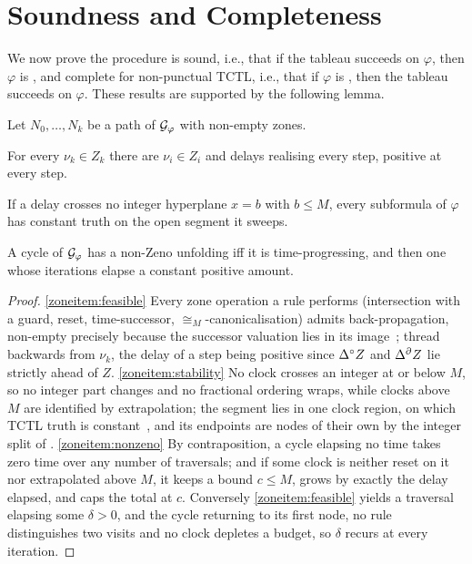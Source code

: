 
\section{Soundness and Completeness}\label{ss:sound}
We now prove the procedure is sound, i.e., that if the tableau succeeds on $\varphi$, then $\varphi$ is \SAT, and complete for non-punctual TCTL, i.e., that if $\varphi$ is \SAT, then the tableau succeeds on $\varphi$. These results are supported by the following lemma.
\begin{lemma}\label{lem:zones}
Let $N_0,\dots,N_k$ be a path of $\mathcal{G}_{\varphi}$ with non-empty zones.
\begin{enumerate*}[label=\emph{(\roman*)}, ref={(\roman*)}, itemjoin={{\ }}, itemjoin*={{\ }}]
\item\label{zoneitem:feasible} For every $\nu_k\in Z_k$ there are $\nu_i\in Z_i$ and delays realising
every step, positive at every  step.
\item\label{zoneitem:stability} If a delay crosses no integer hyperplane $x=b$ with $b\le M$, every
subformula of $\varphi$ has constant truth on the open segment it sweeps.
\item\label{zoneitem:nonzeno} A cycle of $\mathcal{G}_{\varphi}$ has a non-Zeno unfolding iff it is
time-progressing, and then one whose iterations elapse a constant positive amount.
\end{enumerate*}
\end{lemma}
\begin{proof}
\ref{zoneitem:feasible} Every zone operation a rule performs (intersection with a guard, reset, time-successor,
$\cong_M$-canonicalisation) admits back-propagation, non-empty precisely because the successor
valuation lies in its image~\cite{Bouyer05TimedAutomata}; thread backwards from $\nu_k$, the delay of
a  step being positive since $\Delta^{\circ} Z$ and $\Delta^{\partial} Z$ lie strictly ahead of $Z$.
\ref{zoneitem:stability} No clock crosses an integer at or below $M$, so no integer part changes and no
fractional ordering wraps, while clocks above $M$ are identified by extrapolation; the segment lies in
one clock region, on which TCTL truth is
constant~\cite{AlurCourcoubetisDill1990,Bouyer05TimedAutomata}, and its endpoints are nodes of their
own by the integer split of .
\ref{zoneitem:nonzeno} By contraposition, a cycle elapsing no time takes zero time over any number of
traversals; and if some clock is neither reset on it nor extrapolated above $M$, it keeps a bound
$c\le M$, grows by exactly the delay elapsed, and caps the total at $c$. Conversely \ref{zoneitem:feasible} yields
a traversal elapsing some $\delta>0$, and the cycle returning to its first node, no rule distinguishes
two visits and no clock depletes a budget, so $\delta$ recurs at every iteration.
\end{proof}


